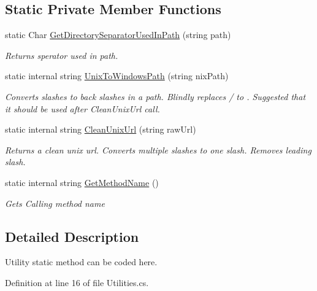 \subsection*{Static Private Member Functions}
\begin{DoxyCompactItemize}
\item 
static Char \mbox{\hyperlink{class_concord_1_1_c3_http_module_1_1_utilities_a34a3dbc84a7e367188bb8cf6a81343c8}{Get\+Directory\+Separator\+Used\+In\+Path}} (string path)
\begin{DoxyCompactList}\small\item\em Returns sperator used in path. \end{DoxyCompactList}\item 
static internal string \mbox{\hyperlink{class_concord_1_1_c3_http_module_1_1_utilities_a40b3b3a642c04aacdbcf766ea049313d}{Unix\+To\+Windows\+Path}} (string nix\+Path)
\begin{DoxyCompactList}\small\item\em Converts slashes to back slashes in a path. Blindly replaces / to . Suggested that it should be used after Clean\+Unix\+Url call. \end{DoxyCompactList}\item 
static internal string \mbox{\hyperlink{class_concord_1_1_c3_http_module_1_1_utilities_a5c66ffbfd1a9f0723be7b7163ce9f778}{Clean\+Unix\+Url}} (string raw\+Url)
\begin{DoxyCompactList}\small\item\em Returns a clean unix url. Converts multiple slashes to one slash. Removes leading slash. \end{DoxyCompactList}\item 
static internal string \mbox{\hyperlink{class_concord_1_1_c3_http_module_1_1_utilities_a28cf8fb31878e9955f8f2f9489e1c4a5}{Get\+Method\+Name}} ()
\begin{DoxyCompactList}\small\item\em Gets Calling method name \end{DoxyCompactList}\end{DoxyCompactItemize}


\subsection{Detailed Description}
Utility static method can be coded here. 



Definition at line 16 of file Utilities.\+cs.



